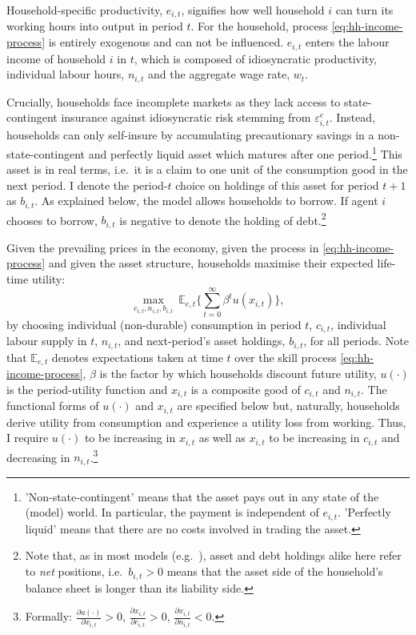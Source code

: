 \documentclass[12pt]{article} %
\numberwithin{equation}{section} %
\numberwithin{figure}{section}
\numberwithin{table}{section}
\begin{document}
Household-specific productivity, $e_{i,t}$, signifies how well household $i$ can turn its working hours into output in period $t$. For the household, process \eqref{eq:hh-income-process} is entirely exogenous and can not be influenced. $e_{i,t}$ enters the labour income of household $i$ in $t$, which is composed of idiosyncratic productivity, individual labour hours, $n_{i,t}$ and the aggregate wage rate, $w_t$.

Crucially, households face incomplete markets as they lack access to state-contingent insurance against idiosyncratic risk stemming from $\varepsilon^e_{i,t}$. Instead, households can only self-insure by accumulating precautionary savings in a non-state-contingent and perfectly liquid asset which matures after one period.\footnote{'Non-state-contingent' means that the asset pays out in any state of the (model) world. In particular, the payment is independent of $e_{i,t}$. 'Perfectly liquid' means that there are no costs involved in trading the asset.} This asset is in real terms, i.e.~it is a claim to one unit of the consumption good in the next period. I denote the period-$t$ choice on holdings of this asset for period $t+1$ as $b_{i,t}$. As explained below, the model allows households to borrow. If agent $i$ chooses to borrow, $b_{i,t}$ is negative to denote the holding of debt.\footnote{Note that, as in most models (e.g.~\cite{kaplan2018}), asset and debt holdings alike here refer to \textit{net} positions, i.e.~$b_{i,t} > 0$ means that the asset side of the household's balance sheet is longer than its liability side.}

Given the prevailing prices in the economy, given the process in \eqref{eq:hh-income-process} and given the asset structure, households maximise their expected life-time utility:
\begin{equation}
    \max_{c_{i,t}, n_{i,t}, b_{i,t}} \ \mathbb{E}_{e,t} \Bigg\{ \sum_{t=0}^{\infty} \beta^t u(x_{i,t}) \Bigg\}, \label{eq:hh-objective}
\end{equation}
by choosing individual (non-durable) consumption in period $t$, $c_{i,t}$, individual labour supply in $t$, $n_{i,t}$, and next-period's asset holdings, $b_{i,t}$, for all periods. Note that $\mathbb{E}_{e,t}$ denotes expectations taken at time $t$ over the skill process \eqref{eq:hh-income-process}, $\beta$ is the factor by which households discount future utility, $u( \cdot )$ is the period-utility function and $x_{i,t}$ is a composite good of $c_{i,t}$ and $n_{i,t}$. The functional forms of $u( \cdot )$ and $x_{i,t}$ are specified below but, naturally, households derive utility from consumption and experience a utility loss from working. Thus, I require $u( \cdot )$ to be increasing in $x_{i,t}$ as well as $x_{i,t}$ to be increasing in $c_{i,t}$ and decreasing in $n_{i,t}$.\footnote{Formally: $\frac{\partial u( \cdot )}{\partial x_{i,t}} > 0$, $\frac{\partial x_{i,t}}{\partial c_{i,t}} > 0$, $\frac{\partial x_{i,t}}{\partial n_{i,t}} < 0$.}
\end{document}
